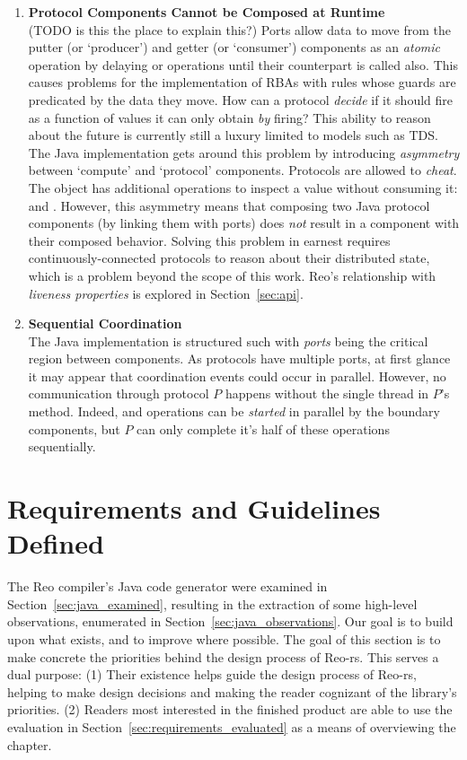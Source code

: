 \begin{enumerate}
	\item \textbf{Protocol Components Cannot be Composed at Runtime}\\
	(TODO is this the place to explain this?)
	Ports allow data to move from the putter (or `producer') and getter (or `consumer') components as an \textit{atomic} operation by delaying  or  operations until their counterpart is called also. This causes problems for the implementation of RBAs with rules whose guards are predicated by the data they move. How can a protocol \textit{decide} if it should fire as a function of values it can only obtain \textit{by} firing? This ability to reason about the future is currently still a luxury limited to models such as TDS. The Java implementation gets around this problem by introducing \textit{asymmetry} between `compute' and `protocol' components. Protocols are allowed to \textit{cheat}. The  object has additional operations to inspect a value without consuming it:  and . However, this asymmetry means that composing two Java protocol components (by linking them with ports) does \textit{not} result in a component with their composed behavior. Solving this problem in earnest requires continuously-connected protocols to reason about their distributed state, which is a problem beyond the scope of this work. Reo's relationship with \textit{liveness properties} is explored in Section~\ref{sec:api}.
	
	\item \textbf{Sequential Coordination}\\
	The Java implementation is structured such with \textit{ports} being the critical region between components. As protocols have multiple ports, at first glance it may appear that coordination events could occur in parallel. However, no communication through protocol $P$ happens without the single thread in $P$'s  method. Indeed,  and  operations can be \textit{started} in parallel by the boundary components, but $P$ can only complete it's half of these operations sequentially.
	
\end{enumerate}

\section{Requirements and Guidelines Defined}
\label{sec:requirements_defined}
The Reo compiler's Java code generator were examined in Section~\ref{sec:java_examined}, resulting in the extraction of some high-level observations, enumerated in Section~\ref{sec:java_observations}. Our goal is to build upon what exists, and to improve where possible. The goal of this section is to make concrete the priorities behind the design process of Reo-rs. This serves a dual purpose: (1) Their existence helps guide the design process of Reo-rs, helping to make design decisions and making the reader cognizant of the library's priorities. (2) Readers most interested in the finished product are able to use the evaluation in Section~\ref{sec:requirements_evaluated} as a means of overviewing the chapter.

